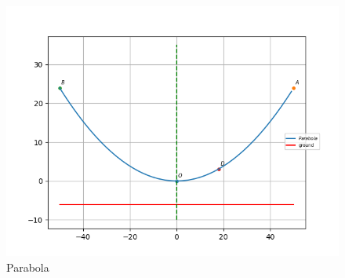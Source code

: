 \documentclass[journal,12pt,twocolumn]{IEEEtran}
\begin{document}
\begin{figure}[!htb]
    \centering
    \includegraphics[width=\columnwidth]{figs/parabola.png}
    \caption{Parabola}
    \label{fig:parabola}
\end{figure}
\end{document}
